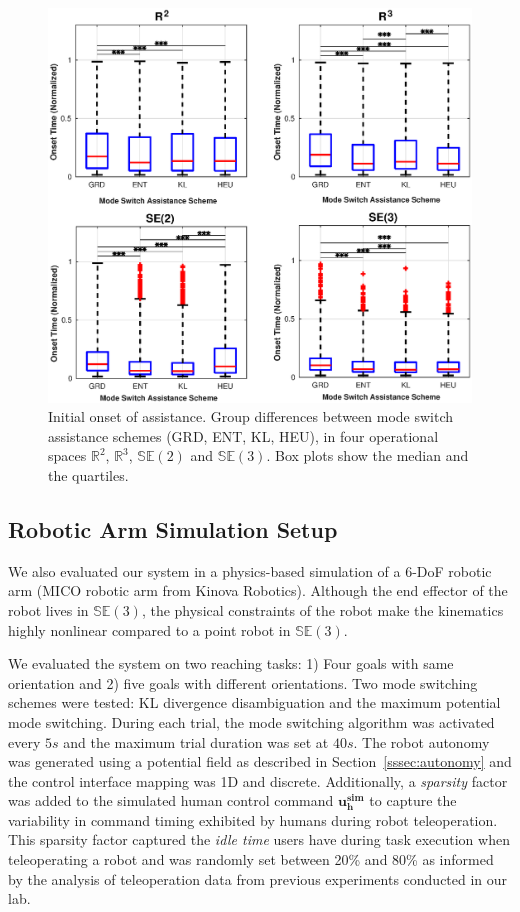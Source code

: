 \documentclass[conference]{IEEEtran}
\begin{document}
 \begin{figure}[t!]
	\centering
	\includegraphics[width= 1.\hsize, height=0.4\vsize]{./figures/initial_alpha.eps}
	\vspace{-0.75cm}
	\caption{Initial onset of assistance. Group differences between mode switch assistance schemes (GRD, ENT, KL, HEU), in four operational spaces $\mathbb{R}^2$, $\mathbb{R}^3$, $\mathbb{SE}(2)$ and $\mathbb{SE}(3)$. Box plots show the median and the quartiles.} 
	\label{fig:initial_alpha}
\end{figure}

\subsection{Robotic Arm	 Simulation Setup}
We also evaluated our system in a physics-based simulation of a 6-DoF robotic arm (MICO robotic arm from Kinova Robotics). Although the end effector of the robot lives in $\mathbb{SE}(3)$, the physical constraints of the robot make the kinematics highly nonlinear compared to a point robot in $\mathbb{SE}(3)$. 

We evaluated the system on two reaching tasks: 1) Four goals with same orientation and 2) five goals with different orientations. Two mode switching schemes were tested: KL divergence disambiguation and the maximum potential mode switching. During each trial, the mode switching algorithm was activated every $5s$ and the maximum trial duration was set at $40s$. The robot autonomy was generated using a potential field as described in Section~\ref{sssec:autonomy} and the control interface mapping was 1D and discrete.
 Additionally, a \textit{sparsity} factor was added to the simulated human control command $\boldsymbol{u^{sim}_h}$ to capture the variability in command timing exhibited by humans during robot teleoperation. This sparsity factor captured the \textit{idle time} users have during task execution when teleoperating a robot and was randomly set between 20\% and 80\% as informed by the analysis of teleoperation data from previous experiments conducted in our lab. 
\end{document}
